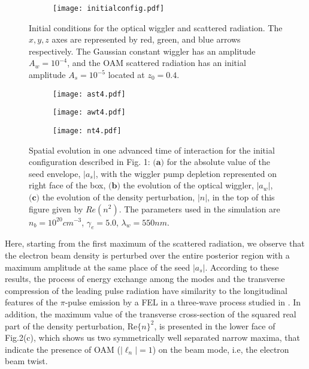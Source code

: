 \documentclass[aps,pra,preprint,showpacs,preprintnumbers,amsmath,amssymb]{revtex4-1}
\begin{document}
\begin{figure}[h!]
\begin{subfigure}{1\textwidth}
  \centering
 \texttt{[image: initialconfig.pdf]}
\end{subfigure}%
\caption{Initial conditions for the optical wiggler and scattered radiation. The $x,y,z$ axes are represented by red, green, and blue arrows respectively. The Gaussian constant wiggler has an amplitude $A_w = 10^{-4}$, and the OAM scattered radiation has an initial amplitude $A_s = 10^{-5}$ located at $z_0 = 0.4$.}
\label{fig:nlinear}
\end{figure}
\begin{figure}[h!]

\begin{subfigure}{0.3\textwidth}
  \centering
  \texttt{[image: ast4.pdf]}
 \caption{}
\end{subfigure}
\begin{subfigure}{0.3\textwidth}
  \centering
  \texttt{[image: awt4.pdf]}
 \caption{}
\end{subfigure}
\begin{subfigure}{0.27\textwidth}
  \centering
  \texttt{[image: nt4.pdf]}
 \caption{}
\end{subfigure}
\caption{Spatial evolution in one advanced time of interaction for the initial configuration described in Fig. 1: $\textbf{(a)}$ for the absolute value of the seed envelope, $|a_s|$, with the wiggler pump depletion represented on right face of the box, $\textbf{(b)}$ the evolution of the optical wiggler, $|a_w|$, $ \textbf{(c)}$ the evolution of the density perturbation, $|n|$, in the top of this figure given by $Re(n^2)$. The parameters used in the simulation are $n_b = 10^{20}cm^{-3}$, $\gamma_e = 5.0$, $\lambda_w = 550nm$.}
\label{fig:nlinear}
\end{figure}
Here, starting from the first maximum of the scattered radiation, we observe that the electron beam density is perturbed over the entire posterior region with a maximum amplitude at the same place of the seed $|a_s|$.            
According to these results, the process of energy exchange among the modes and the transverse compression of the leading pulse radiation have similarity to the longitudinal features of the $\pi$-pulse emission by a FEL in a three-wave process studied in \cite{guarumo}. In addition, the maximum value of the transverse cross-section of the squared real part of the density perturbation, Re$\{n\}^2$, is presented in the lower face of Fig.2(c), which shows us two symmetrically well separated narrow maxima, that indicate the presence of OAM ($|\ell_n| = 1$) on the beam mode, i.e, the electron beam twist. \\
\end{document}
